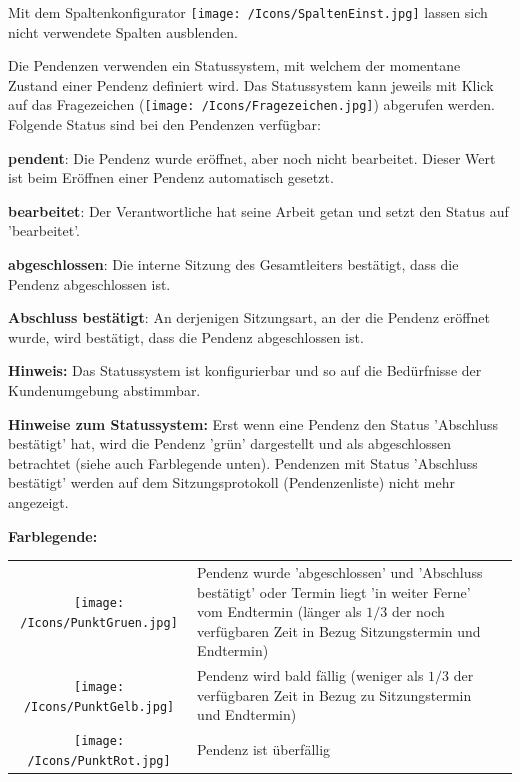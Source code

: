 Mit dem Spaltenkonfigurator \texttt{[image: /Icons/SpaltenEinst.jpg]}  lassen sich nicht verwendete Spalten ausblenden.

\vspace{\baselineskip}

Die Pendenzen verwenden ein Statussystem, mit welchem der momentane Zustand einer Pendenz definiert wird. Das Statussystem kann jeweils mit Klick auf das Fragezeichen (\texttt{[image: /Icons/Fragezeichen.jpg]})  abgerufen werden. Folgende Status sind bei den Pendenzen verfügbar:

\clearpage
\vspace{\baselineskip}

\begin{compactitem}
	\item \textbf{pendent}: Die Pendenz wurde eröffnet, aber noch nicht bearbeitet. Dieser Wert ist beim Eröffnen einer Pendenz automatisch gesetzt.
	\item \textbf{bearbeitet}: Der Verantwortliche hat seine Arbeit getan und setzt den Status auf 'bearbeitet'.
	\item \textbf{abgeschlossen}: Die interne Sitzung des Gesamtleiters bestätigt, dass die Pendenz abgeschlossen ist.
	\item \textbf{Abschluss bestätigt}: An derjenigen Sitzungsart, an der die Pendenz eröffnet wurde, wird bestätigt, dass die Pendenz
abgeschlossen ist.
\end{compactitem}

\textbf{Hinweis:} Das Statussystem ist konfigurierbar und so auf die Bedürfnisse der Kundenumgebung abstimmbar.

\vspace{\baselineskip}

\textbf{Hinweise zum Statussystem:} Erst wenn eine Pendenz den Status 'Abschluss bestätigt' hat, wird die Pendenz 'grün' dargestellt und als abgeschlossen betrachtet (siehe auch Farblegende unten). Pendenzen mit Status 'Abschluss bestätigt' werden auf dem Sitzungsprotokoll (Pendenzenliste) nicht mehr angezeigt.

\vspace{\baselineskip}

\textbf{Farblegende:}

\begin{tabular}{c p{14cm} l} %
\texttt{[image: /Icons/PunktGruen.jpg]} & Pendenz wurde 'abgeschlossen' und 'Abschluss bestätigt' oder Termin liegt 'in weiter Ferne' vom Endtermin (länger als \(1/3\) der noch verfügbaren Zeit in Bezug Sitzungstermin und Endtermin)\\
\texttt{[image: /Icons/PunktGelb.jpg]} & Pendenz wird bald fällig (weniger als \(1/3\) der verfügbaren Zeit in Bezug zu Sitzungstermin und Endtermin)\\
\texttt{[image: /Icons/PunktRot.jpg]} & Pendenz ist überfällig \\
\end{tabular}

